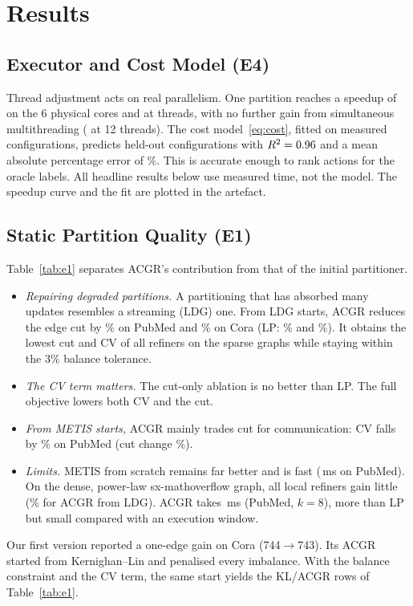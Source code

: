 \section{Results}\label{sec:results}

\subsection{Executor and Cost Model (E4)}
Thread adjustment acts on real parallelism. One partition reaches a speedup of \SpeedupSix{}
on the 6 physical cores and \SpeedupMax{} at \SpeedupMaxThreads{} threads, with no further
gain from simultaneous multithreading (\SpeedupTwelve{} at 12 threads). The cost
model~\eqref{eq:cost}, fitted on \CalPoints{} measured configurations, predicts held-out
configurations with $R^2=0.96$ and a mean absolute percentage error of \CalMape\%. This is
accurate enough to rank actions for the oracle labels. All headline results below use measured
time, not the model. The speedup curve and the fit are plotted in the artefact.


\subsection{Static Partition Quality (E1)}
Table~\ref{tab:e1} separates ACGR's contribution from that of the initial partitioner.
\begin{itemize}
  \item \emph{Repairing degraded partitions.} A partitioning that has absorbed many updates
        resembles a streaming (LDG) one. From LDG starts, ACGR reduces the edge cut by
        \EOnePubLDGCutRed\% on PubMed and \EOneCoraLDGCutRed\% on Cora (LP:
        \EOnePubLDGLPRed\% and \EOneCoraLDGLPRed\%). It obtains the lowest cut and CV of all
        refiners on the sparse graphs while staying within the 3\% balance tolerance.
  \item \emph{The CV term matters.} The cut-only ablation is no better than LP. The full
        objective lowers both CV and the cut.
  \item \emph{From METIS starts,} ACGR mainly trades cut for communication: CV falls by
        \EOnePubMetisCVRed\% on PubMed (cut change \EOnePubMetisCutRed\%).
  \item \emph{Limits.} METIS from scratch remains far better and is fast (\EOnePubMetisMs\,ms on
        PubMed). On the dense, power-law sx-mathoverflow graph, all local refiners gain little
        (\EOneMathLDGCutRed\% for ACGR from LDG). ACGR takes \EOnePubAcgrMs\,ms (PubMed, $k=8$),
        more than LP but small compared with an execution window.
\end{itemize}
Our first version reported a one-edge gain on Cora (744$\to$743). Its ACGR started from
Kernighan--Lin and penalised every imbalance. With the balance constraint and the CV term,
the same start yields the KL/ACGR rows of Table~\ref{tab:e1}.

